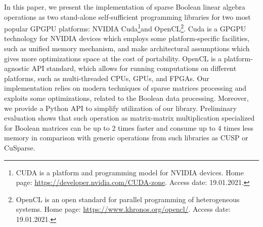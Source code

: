 In this paper, we present the implementation of sparse Boolean linear algebra operations as two stand-alone self-sufficient programming libraries for two most popular GPGPU platforms: NVIDIA Cuda\footnote{CUDA is a platform and programming model for NVIDIA devices. Home page: \url{https://developer.nvidia.com/CUDA-zone}. Access date: 19.01.2021.}and OpenCL\footnote{OpenCL is an open standard for parallel programming of heterogeneous systems. Home page: \url{https://www.khronos.org/opencl/}. Access date: 19.01.2021.}.
Cuda is a GPGPU technology for NVIDIA devices which employs some platform-specific facilities, such as unified memory mechanism, and make architectural assumptions which gives more optimizations space at the cost of portability.
OpenCL is a platform-agnostic API standard, which allows for running computations on different platforms, such as multi-threaded CPUs, GPUs, and FPGAs.
Our implementation relies on modern techniques of sparse matrices processing and exploits some optimizations, related to the Boolean data processing.
Moreover, we provide a Python API to simplify utilization of our library.
Preliminary evaluation shows that such operation as matrix-matrix multiplication specialized for Boolean matrices can be up to 2 times faster and consume up to 4 times less memory in comparison with generic operations from such libraries as CUSP or CuSparse.